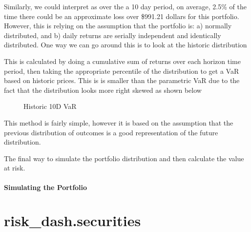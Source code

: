 \documentclass[letterpaper,10pt,english]{sphinxmanual}
\begin{document}
Similarly, we could interpret as over the a 10 day period, on average,
2.5\% of the time there could be an approximate loss over \$991.21 dollars
for this portfolio. However, this is relying on the assumption that the
portfolio is: a) normally distributed, and b) daily returns are serially
independent and identically distributed. One way we can go around this
is to look at the historic distribution

%
\begin{sphinxVerbatim}[commandchars=\\\{\}]
   
\end{sphinxVerbatim}

This is calculated by doing a cumulative sum of returns over each
horizon time period, then taking the appropriate percentile of the
distribution to get a VaR based on historic prices. This is is smaller
than the parametric VaR due to the fact that the distribution looks more
right skewed as shown below

\begin{figure}[htbp]
\centering
\capstart

\noindent{}
\caption{Historic 10D VaR}\label{\detokenize{gettingstarted:id3}}\end{figure}

This method is fairly simple, however it is based on the assumption that
the previous distribution of outcomes is a good representation of the
future distribution.

The final way to simulate the portfolio distribution and then calculate
the value at risk.


\subsubsection{Simulating the Portfolio}
\label{\detokenize{gettingstarted:simulating-the-portfolio}}

\chapter{risk\_dash.securities}
\label{\detokenize{securities:module-risk_dash.securities}}\label{\detokenize{securities:risk-dash-securities}}\label{\detokenize{securities:securities}}\label{\detokenize{securities::doc}}
\end{document}
